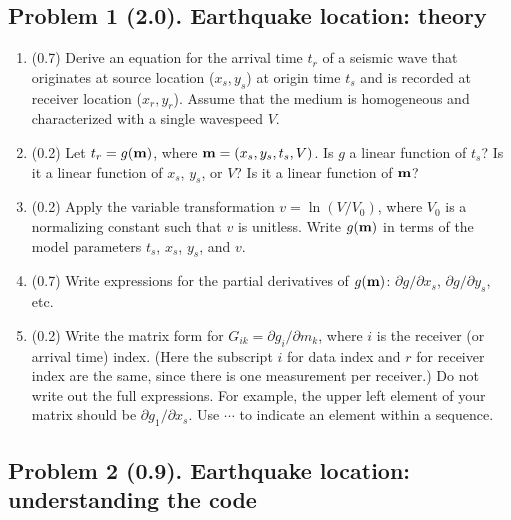 \documentclass[11pt,titlepage,fleqn]{article}
\begin{document}

\subsection*{Problem 1 (2.0). Earthquake location: theory}

\begin{enumerate}
\item (0.7) Derive an equation for the arrival time $t_r$ of a seismic wave that originates at source location ($x_s, y_s$) at origin time $t_s$ and is recorded at receiver location ($x_r, y_r$). Assume that the medium is homogeneous and characterized with a single wavespeed $V$.

\item (0.2) Let $t_r = g(\mbox{${\bf m}$})$, where $\mbox{${\bf m}$} = (x_s,y_s,t_s,V)$.
Is $g$ a linear function of $t_s$? Is it a linear function of $x_s$, $y_s$, or $V$?
Is it a linear function of $\mbox{${\bf m}$}$?

\item (0.2) Apply the variable transformation $v = \ln(V/V_0)$, where $V_0$ is a normalizing constant such that $v$ is unitless. Write $g(\mbox{${\bf m}$})$ in terms of the model parameters $t_s$, $x_s$, $y_s$, and $v$.

\item (0.7) Write expressions for the partial derivatives of $g(\mbox{${\bf m}$})$: $\partial g/ \partial x_s$, $\partial g/ \partial y_s$, etc.

\item (0.2) Write the matrix form for $G_{ik} = \partial g_i/ \partial m_k$, where $i$ is the receiver (or arrival time) index. (Here the subscript $i$ for data index and $r$ for receiver index are the same, since there is one measurement per receiver.) Do not write out the full expressions.
For example, the upper left element of your matrix should be $\partial g_1/\partial x_s$.
Use $\cdots$ to indicate an element within a sequence.

\end{enumerate}


\pagebreak
\subsection*{Problem 2 (0.9). Earthquake location: understanding the code}
\end{document}
